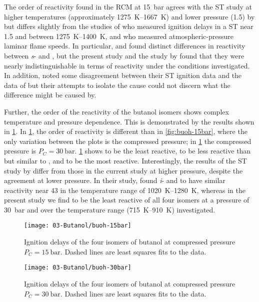 \documentclass[../main.tex]{subfiles}
\begin{document}
The order of reactivity found in the RCM at \SI{15}{\bar} agrees with the ST
study at higher temperatures (approximately \SIrange{1275}{1667}{\kelvin}) and lower pressure
(\SI{1.5}{\atmosphere}) by \textcite{Stranic2012} but differs slightly from the studies of
\textcite{Moss2008} who measured ignition delays in a ST near \SI{1.5}{\atmosphere}
and between \SIrange{1275}{1400}{\kelvin}, and \textcite{Veloo2011a} who measured
atmospheric-pressure laminar flame speeds. In particular, \textcite{Moss2008}
and \textcite{Veloo2011a} found distinct differences in reactivity between
\textit{s}- and \iBuOH{}, but the present study and the study by
\textcite{Stranic2012} found that they were nearly indistinguishable in terms
of reactivity under the conditions investigated. In addition,
\textcite{Stranic2012} noted some disagreement between their ST
ignition data and the data of \textcite{Moss2008} but their attempts to isolate
the cause could not discern what the difference might be caused by.

Further, the order of the reactivity of the butanol isomers shows complex
temperature and pressure dependence. This is demonstrated by the results shown
in \cref{fig:buoh-30bar}. In \cref{fig:buoh-30bar}, the order of
reactivity is different than in \cref{fig:buoh-15bar}, where the only
variation between the plots is the compressed pressure; in
\cref{fig:buoh-30bar} the compressed pressure is $P_C=\SI{30}{\bar}$.
\cref{fig:buoh-30bar} shows \iBuOH{} to be the least reactive,
\sBuOH{} to be less reactive than but similar to \tBuOH{},
and \nBuOH{} to be the most reactive. Interestingly, the results of
the ST study by \textcite{Stranic2012} differ from those in the current
study at higher pressure, despite the agreement at lower pressure. In their
study, \textcite{Stranic2012} found \textit{i}- and \nBuOH{} to have
similar reactivity near \SI{43}{\atmosphere} in the temperature range of \SIrange{1020}{1280}{\kelvin},
whereas in the present study we find \iBuOH{} to be the least
reactive of all four isomers at a pressure of \SI{30}{\bar} and over the temperature
range (\SIrange{715}{910}{\kelvin}) investigated.

\begin{figure}
    \begin{floatrow}
    \ffigbox
        {\texttt{[image: 03-Butanol/buoh-15bar]}}
        {\caption{Ignition delays of the four isomers of butanol at compressed
            pressure $P_C=\SI{15}{\bar}$. Dashed lines are least squares fits to the
            data.}
        \label{fig:buoh-15bar}}
    \ffigbox
        {\texttt{[image: 03-Butanol/buoh-30bar]}}
        {\caption{Ignition delays of the four isomers of butanol at compressed
            pressure $P_C=\SI{30}{\bar}$. Dashed lines are least squares fits to the
            data.}
        \label{fig:buoh-30bar}}
    \end{floatrow}
\end{figure}
\end{document}
